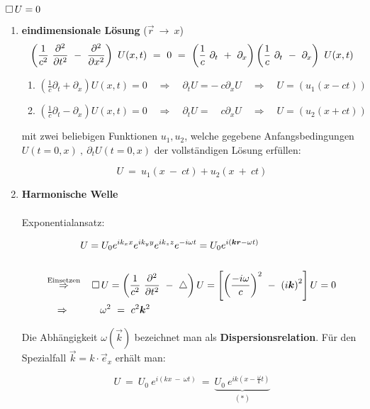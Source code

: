 $\mathop{{}\Box}\nolimits U = 0$

\begin{enumerate}
\item \textbf{eindimensionale Lösung} ($\vec{r}\  \rightarrow \ x$)
\begin{equation*}
\left(\frac{1}{c^2} \ \pddiff{}{t} \ - \ \pddiff{}{x}\right)\ U(x,t) \ = \ 0 \ = \ \left(\frac{1}{c}\ \partial_t \ + \ \partial_x\right)\left(\frac{1}{c} \ \partial_t \ - \ \partial_x\right) \ U(x,t)
\end{equation*}

\begin{enumerate}
\item $\left(\frac{1}{c}\partial_t+\partial_x\right)U(x,t) = 0 \quad\Rightarrow\quad \partial_t U = - \ c \partial_x U \quad\Rightarrow\quad U = (u_1(x-ct))$
\item $\left(\frac{1}{c}\partial_t-\partial_x\right)U(x,t) = 0 \quad\Rightarrow\quad \partial_t U =\quad c \partial_x U \quad\Rightarrow\quad U = (u_2(x+ct))$
\end{enumerate}

mit zwei beliebigen Funktionen $u_1,u_2$, welche gegebene Anfangsbedingungen $U(t=0,x) \ , \ \partial_t U(t=0,x)$ der vollständigen Lösung erfüllen:

\begin{equation*}
U \ = \ u_1(x\ -\ ct) + u_2(x\ +\ ct)
\end{equation*}

\item
\textbf{Harmonische Welle}\\
\ \\
Exponentialansatz:

\begin{align*}
& U=U_0 e^{ik_x x}e^{ik_y y}e^{ik_z z}e^{-i\omega t} = U_0 e^{i(\vec{k}\vec{r}-\omega
t)}\\
\ \\
\overset{\text{Einsetzen}}{\Rightarrow} &\quad\Dalembert U = \left(\frac{1}{c^2} \ \pddiff{}{t} \ - \ \laplace\right)U = \left[\left(\frac{-i\omega}{c}\right)^2 \ - \ \left(i\vec{k}\right)^2\right]U = 0\\
\Rightarrow \ \quad&\qquad \omega^2 \ = \ c^2 \vec{k}^2
\end{align*}

Die Abhängigkeit $\omega(\vec{k})$ bezeichnet man als \textbf{Dispersionsrelation}. Für den Spezialfall $\vec{k} = k \cdot \vec{e}_x$ erhält man:

\begin{equation*}
U \ = \ U_0 \ e^{i(kx \ - \ \omega t)} \ = \ \underbrace{U_0 \ e^{ik\left(x-\frac{\omega}{k}t\right)} }_{(*)}
\end{equation*}


\end{enumerate}
